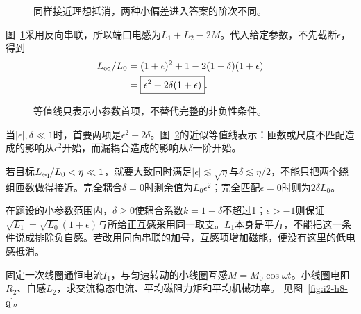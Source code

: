 \begin{figure}[H]\centering
{}
\caption{同样接近理想抵消，两种小偏差进入答案的阶次不同。}\label{fig:i2-h7-q}
\end{figure}
\begin{solution}
图~\ref{fig:i2-h7-q}采用反向串联，所以端口电感为$L_1+L_2-2M$。代入给定参数，不先截断$\epsilon$，得到
\[\begin{aligned}
L_{\rm eq}/L_0
&=(1+\epsilon)^2+1-2(1-\delta)(1+\epsilon)\\
&=\boxed{\epsilon^2+2\delta(1+\epsilon)}.
\end{aligned}\]

\begin{figure}[H]\centering
{}
\caption{等值线只表示小参数首项，不替代完整的非负性条件。}\label{fig:i2-h7-s}
\end{figure}

当$|\epsilon|,\delta\ll1$时，首要两项是$\epsilon^2+2\delta$。图~\ref{fig:i2-h7-s}的近似等值线表示：匝数或尺度不匹配造成的影响从$\epsilon^2$开始，而漏耦合造成的影响从$\delta$一阶开始。

若目标$L_{\rm eq}/L_0<\eta\ll1$，就要大致同时满足$|\epsilon|\lesssim\sqrt\eta$与$\delta\lesssim\eta/2$，不能只把两个绕组匝数做得接近。完全耦合$\delta=0$时剩余值为$L_0\epsilon^2$；完全匹配$\epsilon=0$时则为$2\delta L_0$。

在题设的小参数范围内，$\delta\ge0$使耦合系数$k=1-\delta$不超过1；$\epsilon>-1$则保证$\sqrt{L_1}=\sqrt{L_0}(1+\epsilon)$与所给正互感采用同一取支。$L_1$本身是平方，不能把这一条件说成排除负自感。若改用同向串联的加号，互感项增加磁能，便没有这里的低电感抵消。
\end{solution}

\begin{exercise}[转动小线圈的负载阻力矩]\label{ex:i2-h8}
固定一次线圈通恒电流$I_1$，与匀速转动的小线圈互感$M=M_0\cos\omega t$。小线圈电阻$R_2$、自感$L_2$，求交流稳态电流、平均磁阻力矩和平均机械功率。 见图~\ref{fig:i2-h8-q}。
\end{exercise}

